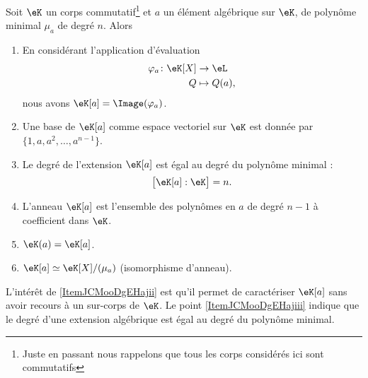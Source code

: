 \begin{proposition}   \label{PropURZooVtwNXE}
    Soit \( \eK\) un corps commutatif\footnote{Juste en passant nous rappelons que tous les corps considérés ici sont commutatifs} et \( a\) un élément algébrique sur \( \eK\), de polynôme minimal \( \mu_a\) de degré \( n\). Alors
    \begin{enumerate}
        \item\label{ItemJCMooDgEHajmi}
            En considérant l'application d'évaluation
            \begin{equation}
                \begin{aligned}
                    \varphi_a\colon \eK[X]&\to \eL \\
                    Q&\mapsto Q(a), 
                \end{aligned}
            \end{equation}
            nous avons \( \eK[a]=\Image(\varphi_a)\).
        \item\label{ItemJCMooDgEHajiv}
            Une base de \( \eK[a]\) comme espace vectoriel sur \( \eK\) est donnée par \( \{ 1,a,a^2,\ldots, a^{n-1} \}\).
        \item\label{ItemJCMooDgEHajiii}
            Le degré de l'extension \( \eK[a]\) est égal au degré du polynôme minimal :
            \begin{equation}
                \big[ \eK[a]:\eK \big]=n.
            \end{equation}
         \item
            L'anneau \( \eK[a]\) est l'ensemble des polynômes en \( a\) de degré \( n-1\) à coefficient dans \( \eK\).
        \item\label{ItemJCMooDgEHaji}
            \( \eK(a)=\eK[a]\).
        \item   \label{ItemJCMooDgEHajii}
            \( \eK[a]\simeq\eK[X]/(\mu_a)\) (isomorphisme d'anneau).
    \end{enumerate}
\end{proposition}
L'intérêt de \ref{ItemJCMooDgEHajii} est qu'il permet de caractériser \( \eK[a]\) sans avoir recours à un sur-corps de \( \eK\). Le point \ref{ItemJCMooDgEHajiii} indique que le degré d'une extension algébrique est égal au degré du polynôme minimal.

